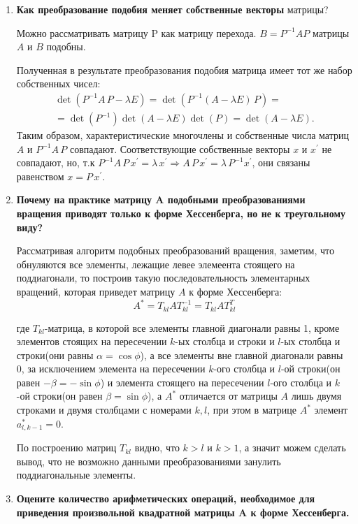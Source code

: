 \documentclass[12pt, a4paper]{article}
\begin{document}
\begin{enumerate}
    \item {\bf Как преобразование подобия меняет собственные векторы }
    матрицы?

    Можно рассматривать матрицу P как матрицу перехода. $B = P^{-1}AP$ матрицы $A$ и $B$ подобны. 
    
    Полученная в результате преобразования подобия матрица имеет тот же набор собственных чисел:
	\begin{multline*}
		\det \left( P^{-1} A \, P - \lambda E \right) = \det \left( P^{-1} (A - \lambda E) \, P \right) = \\
		= \det \left( P^{-1} \right) \det \left( A - \lambda E \right) \det \left( P \right) = \det \left( A - \lambda E \right).
	\end{multline*}
	Таким образом, характеристические многочлены и собственные числа матриц $ A $ и $ P^{-1} A \, P $ совпадают. Соответствующие собственные векторы $ x $ и $ x^{'} $ не совпадают, но, т.к $ P^{-1} A \, P \, x^{'} = \lambda \, x^{'} \Rightarrow A \, P \, x^{'} = \lambda \, P^{-1} x^{'} $, они связаны равенством $ x = P \, x^{'} $.


    \item {\bf Почему на практике матрицу A подобными преобразованиями вращения приводят только к форме Хессенберга, но не к треугольному виду? }
    
    Рассматривая алгоритм подобных преобразований вращения, заметим, что обнуляются все элементы, лежащие левее элемеента стоящего на поддиагонали, то построив такую последовательность элементарных вращений, которая приведет матрицу $A$ к форме Хессенберга:
    \[
        A^*=T_{kl}AT_{kl}^{-1}=T_{kl}AT_{kl}^T
    \]

    где $T_{kl}$-матрица, в которой все элементы главной диагонали равны 1, кроме элементов стоящих на пересечении $k$-ых столбца и строки и $l$-ых столбца и строки(они равны $\alpha = \cos \phi$), а все элементы вне главной диагонали равны 0, за исключением элемента на пересечении $k$-ого столбца и $l$-ой строки(он равен $-\beta=-\sin\phi$) и элемента стоящего на пересечении $l$-ого столбца и $k$-ой строки(он равен $\beta=\sin\phi$), а $A^*$ отличается от матрицы $A$ лишь двумя строками и двумя столбцами с номерами $k, l$, при этом в матрице $A^*$ элемент $a_{l,k-1}^*=0$.

    По построению матриц $T_{kl}$ видно, что $k>l$ и $k>1$, а значит можем сделать вывод, что не возможно данными преобразованиями занулить поддиагональные элементы.

    \item {\bf Оцените количество арифметических операций, необходимое для приведения произвольной квадратной матрицы A к форме Хессенберга. }
    

\end{enumerate}
\end{document}
